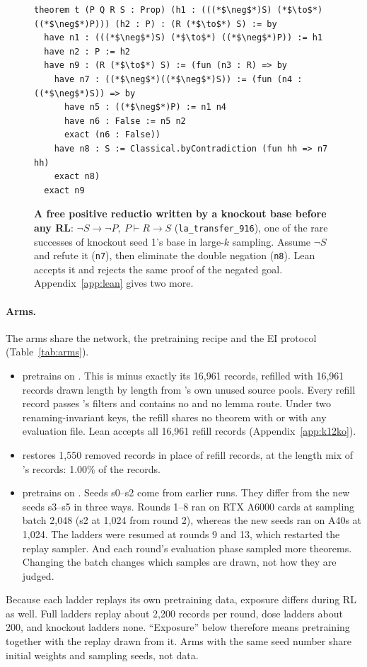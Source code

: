 \begin{figure}[t]
\centering
\begin{minipage}{0.96\linewidth}
\begin{lstlisting}
theorem t (P Q R S : Prop) (h1 : (((*$\neg$*)S) (*$\to$*) ((*$\neg$*)P))) (h2 : P) : (R (*$\to$*) S) := by
  have n1 : (((*$\neg$*)S) (*$\to$*) ((*$\neg$*)P)) := h1
  have n2 : P := h2
  have n9 : (R (*$\to$*) S) := (fun (n3 : R) => by
    have n7 : ((*$\neg$*)((*$\neg$*)S)) := (fun (n4 : ((*$\neg$*)S)) => by
      have n5 : ((*$\neg$*)P) := n1 n4
      have n6 : False := n5 n2
      exact (n6 : False))
    have n8 : S := Classical.byContradiction (fun hh => n7 hh)
    exact n8)
  exact n9
\end{lstlisting}
\end{minipage}
\caption{\textbf{A free positive reductio written by a knockout base before any RL}: $\neg S \to \neg P,\ P \vdash R
\to S$ (\texttt{la\_transfer\_916}), one of the rare successes of knockout seed 1's base in large-$k$ sampling. Assume
$\neg S$ and refute it (\texttt{n7}), then eliminate the double negation (\texttt{n8}). Lean accepts it and rejects the
same proof of the negated goal. Appendix~\ref{app:lean} gives two more.}
\label{fig:lean}
\end{figure}

\paragraph{Arms.} The arms share the network, the pretraining recipe and the EI protocol (Table~\ref{tab:arms}).
\begin{itemize}
\item \textbf{\Kko{}} pretrains on \KTko{}. This is \KT{} minus exactly its 16,961 \sigp{} records, refilled with
16,961 records drawn length by length from \KT{}'s own unused source pools. Every refill record passes \KT{}'s filters
and contains no \sigp{} and no lemma route. Under two renaming-invariant keys, the refill shares no theorem with \KT{}
or with any evaluation file. Lean accepts all 16,961 refill records (Appendix~\ref{app:k12ko}).
\item \textbf{\Kdose{}} restores 1,550 removed \sig{} records in place of refill records, at the length mix of \KT{}'s
\sig{} records: 1.00\% of the records.
\item \textbf{\Kfull{}} pretrains on \KT{}. Seeds s0--s2 come from earlier runs. They differ from the new seeds s3--s5
in three ways. Rounds 1--8 ran on RTX A6000 cards at sampling batch 2,048 (s2 at 1,024 from round 2), whereas the new seeds
ran on A40s at 1,024.
The ladders were resumed at rounds 9 and 13, which restarted the replay sampler. And each round's evaluation phase
sampled more theorems. Changing the batch changes which samples are drawn, not how they are judged.
\end{itemize}
Because each ladder replays its own pretraining data, exposure differs during RL as well. Full ladders replay about
2,200 \sigp{} records per round, dose ladders about 200, and knockout ladders none. ``Exposure'' below therefore means
pretraining together with the replay drawn from it. Arms with the same seed number share initial weights and sampling
seeds, not data.

